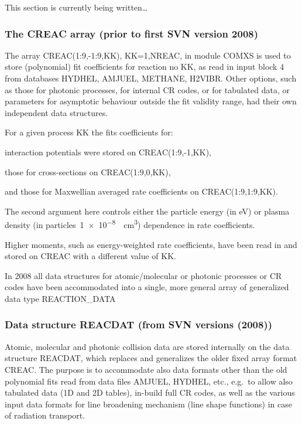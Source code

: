 This section is currently being written\dots

\subsubsection{The CREAC array (prior to first SVN version 2008)}

The array CREAC(1:9,-1:9,KK), KK=1,NREAC, in module COMXS is used to store
(polynomial) fit coefficients for reaction no KK, as read in input block 4 from
databases HYDHEL, AMJUEL, METHANE, H2VIBR.
Other options, such as those for photonic processes, for internal CR codes, or
for tabulated data, or parameters for asymptotic behaviour outside the fit
validity range, had their own independent data structures.

For a given process KK the fits coefficients for:

interaction potentials were stored on
CREAC(1:9,-1,KK),

those for cross-sections
on CREAC(1:9,0,KK),

and those for Maxwellian averaged rate coefficients on CREAC(1:9,1:9,KK).

\medskip

The second argument here controls either the particle energy (in
\si{\electronvolt}) or plasma density (in
particles~\SI{1e-8}{\per\cubic\centi\metre}) dependence in rate coefficients.

Higher moments, such as energy-weighted rate coefficients, have been read in
and stored on CREAC with a different value of KK.

In 2008 all data structures for atomic\slash molecular or photonic processes or
CR codes have been accommodated into a single, more general array of
generalized data type REACTION\_DATA

\subsubsection{Data structure REACDAT (from SVN versions (2008))}

Atomic, molecular and photonic collision data are stored internally on the data
structure REACDAT, which replaces and generalizes the older fixed array format
CREAC.
The purpose is to accommodate also data formats other than the old polynomial
fits read from data files AMJUEL, HYDHEL, etc., e.g.\ to allow also tabulated
data (1D and 2D tables), in-build full CR codes, as well as the various input
data formats for line broadening mechanism (line shape functions) in case of
radiation transport.


